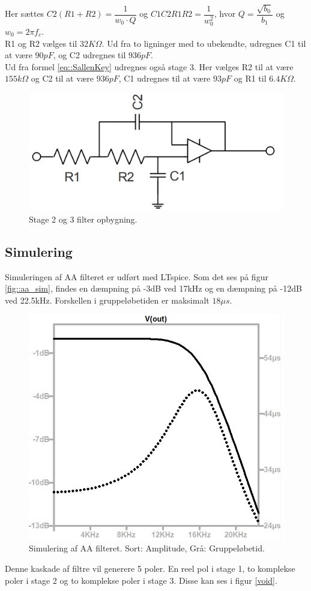 Her sættes $C2(R1+R2) = \dfrac{1}{w_0\cdot Q}$ og $C1C2R1R2 = \dfrac{1}{w_0^2}$, hvor $Q = \dfrac{\sqrt{b_0}}{b_1}$ og $w_0 = 2 \pi  f_c$.
\\R1 og R2 vælges til $32K\Omega$. Ud fra to ligninger med to ubekendte, udregnes C1 til at være $90pF$, og C2 udregnes til $936pF$.\\
Ud fra formel \ref{eq::SallenKey} udregnes også stage 3. Her vælges R2 til at være $155k\Omega$ og C2 til at være $936pF$, C1 udregnes til at være $93pF$ og R1 til $6.4K\Omega$. 
\begin{figure}[h!]
	\centering
	\includegraphics[scale=0.3]{./billeder/stage23.png}
	\caption{Stage 2 og 3 filter opbygning.}
	\label{fig::filter_stage2}
\end{figure}
\FloatBlock
\subsection{Simulering}
Simuleringen af AA filteret er udført med LTspice. Som det ses på figur \ref{fig::aa_sim}, findes en dæmpning på -3dB ved 17kHz og en dæmpning på -12dB ved 22.5kHz. Forskellen i gruppeløbetiden er maksimalt $18 \mu s$.
\begin{figure}[h!]
	\centering
	\includegraphics[scale=0.2]{./billeder/aa_sim1.png}
	\caption{Simulering af AA filteret. Sort: Amplitude, Grå: Gruppeløbetid.}
	\label{fig::afilter_aasim}
\end{figure}
\FloatBlock
Denne kaskade af filtre vil generere 5 poler. En reel pol i stage 1, to komplekse poler i stage 2 og to komplekse poler i stage 3. Disse kan ses i figur \ref{void}.

